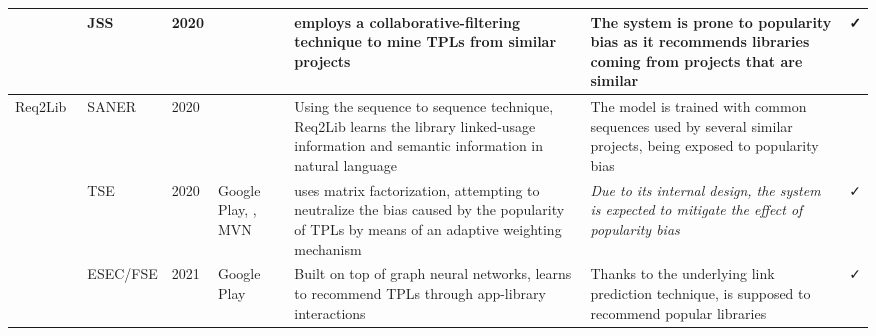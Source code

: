 \begin{table*}[t!]
\begin{tabular}{|p{1.40cm} | p{1.1cm} | p{0.4cm} | p{1.50cm} | p{4.4cm} |p{4.4cm} | p{0.45cm} |}
		\CR~\cite{NGUYEN2019110460} & JSS & 2020 & \GH & \CR employs a collaborative-filtering technique to mine TPLs from similar projects & The system is prone to popularity bias as it recommends libraries coming from projects that are similar & \cellcolor{lightgray}\faCheck  \\ \hline
		Req2Lib~\cite{9054865}& SANER & 2020 & \GH & Using the sequence to sequence technique, Req2Lib learns the library linked-usage information and semantic
		information in natural language & The model is trained with common sequences used by several similar projects, being exposed to popularity bias  & \untick \\ \hline
		
		\LS~\cite{9043686} & TSE & 2020 & Google Play, \GH, MVN & \LS uses matrix factorization, attempting to neutralize the bias caused by the popularity of TPLs by means of an adaptive weighting mechanism  & \emph{Due to its internal design, the system is expected to mitigate the effect of popularity bias} & \cellcolor{lightgray}\faCheck \\ \hline
		\GR~\cite{10.1145/3468264.3468552} & ESEC/FSE & 2021 & Google Play  & Built on top of graph neural networks, \GR learns to recommend TPLs through app-library interactions & Thanks to the underlying link prediction technique, \GR is supposed to recommend popular libraries   & \cellcolor{lightgray}\faCheck \\ \hline
	\end{tabular}
	\label{tab:summary}
\end{table*}






